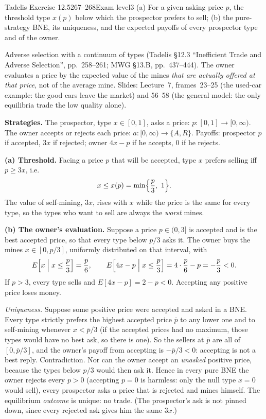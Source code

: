 \begin{exsol}{Tadelis Exercise 12.5}{267--268}{Exam level}{3}
\asked (a) For a given asking price $p$, the threshold type $x(p)$ below which the prospector prefers to
sell; (b) the pure-strategy BNE, its uniqueness, and the expected payoffs of every prospector type and of
the owner.

\method Adverse selection with a continuum of types (Tadelis \S12.3 ``Inefficient Trade and Adverse
Selection'', pp.~258--261; MWG \S13.B, pp.~437--444). The owner evaluates a price by the expected value of
the mines \emph{that are actually offered at that price}, not of the average mine. Slides: Lecture~7,
frames~23--25 (the used-car example: the good cars leave the market) and 56--58 (the general model: the
only equilibria trade the low quality alone).

\solution
\textbf{Strategies.} The prospector, type $x \in [0,1]$, asks a price: $p : [0,1] \to [0, \infty)$. The owner
accepts or rejects each price: $a : [0, \infty) \to \{A, R\}$. Payoffs: prospector $p$ if accepted, $3x$ if
rejected; owner $4x - p$ if he accepts, $0$ if he rejects.

\textbf{(a) Threshold.} Facing a price $p$ that will be accepted, type $x$ prefers selling iff $p \ge 3x$, i.e.\
\[
  x \le x(p) = \min\Bigl\{\frac p3,\ 1\Bigr\}.
\]
The value of self-mining, $3x$, rises with $x$ while the price is the same for every type, so the types
who want to sell are always the \emph{worst} mines.

\textbf{(b) The owner's evaluation.} Suppose a price $p \in (0, 3]$ is accepted and is the best accepted
price, so that every type below $p/3$ asks it. The owner buys the mines $x \in [0, p/3]$, uniformly
distributed on that interval, with
\[
  E\Bigl[x \Bigm| x \le \frac p3\Bigr] = \frac{p}{6}, \qquad
  E\Bigl[4x - p \Bigm| x \le \frac p3\Bigr] = 4\cdot\frac p6 - p = -\frac p3 < 0 .
\]
If $p > 3$, every type sells and $E[4x - p] = 2 - p < 0$. Accepting any positive price loses money.

\emph{Uniqueness.} Suppose some positive price were accepted and asked in a BNE. Every type strictly prefers
the highest accepted price $\bar p$ to any lower one and to self-mining whenever $x < \bar p/3$ (if the
accepted prices had no maximum, those types would have no best ask, so there is one). So the sellers at
$\bar p$ are all of $[0, \bar p/3]$, and the owner's payoff from accepting is $-\bar p/3 < 0$: accepting is not
a best reply. Contradiction. Nor can the owner accept an \emph{unasked} positive price, because the types
below $p/3$ would then ask it. Hence in every pure BNE the owner rejects every $p > 0$ (accepting $p = 0$
is harmless: only the null type $x = 0$ would sell), every prospector asks a price that is rejected and
mines himself. The equilibrium \emph{outcome} is unique: no trade. (The prospector's ask is not pinned
down, since every rejected ask gives him the same $3x$.)


\end{exsol}
